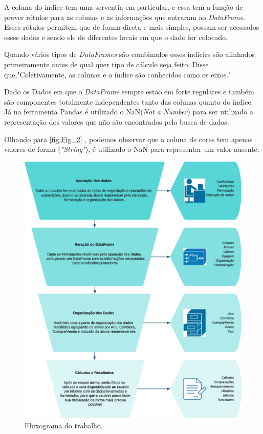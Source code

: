\par A coluna do índice tem uma serventia em particular, e essa tem a função de prover rótulos para as colunas e as informações que entraram ao \textit{DataFrame}. Esses rótulos permitem que de forma direta e mais simples, possam ser acessados esses dados e sendo ele de diferentes locais em que o dado for colocado.

\par Quando vários tipos de \textit{DataFrames} são combinados esses indicies são alinhados primeiramente antes de qual quer tipo de cálculo seja feito. Disse \cite{Petrou2017-no} que,"Coletivamente, as colunas e o índice são conhecidos como os eixos."

\par Dado os Dados em que o \textit{DataFrame} sempre estão em forte regulares e também são componentes totalmente independentes tanto das colunas quanto do índice.
Já na ferramenta Pandas é utilizado o NaN(\textit{Not a Number}) para ser utilizado a representação dos valores que não são encontrados pela busca de dados.
\par Olhando para \autoref{fig:Fig_2} , podemos observar que a coluna de cores tem apenas valores de forma (\textit{"String"}), é utilizado o NaN para representar um valor ausente.

	\begin{figure}[ht]
    \caption{\label{fig:Fig_4}Fluxograma do trabalho.}
    \begin{center}
    \includegraphics[scale=0.45]{TCC_Renda/figuras/TCC Fluxograma V5.eps}
    \end{center}
    \end{figure}